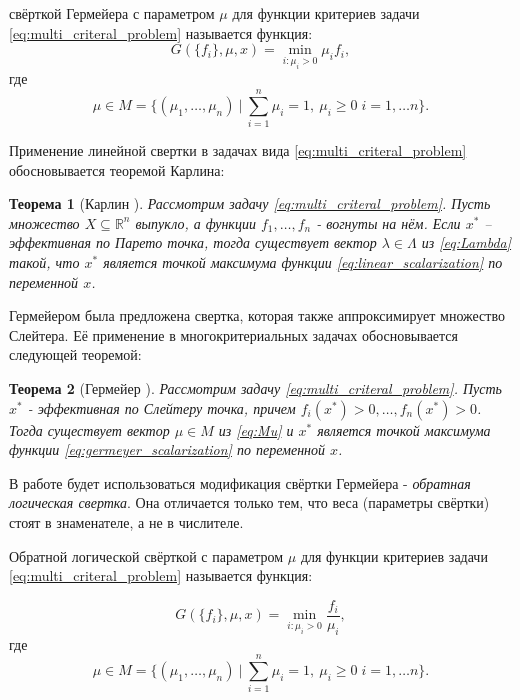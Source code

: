 \begin{Def}
	свёрткой Гермейера с параметром $\mu$ для 
	функции критериев задачи \eqref{eq:multi_criteral_problem}
	называется функция:
	\begin{equation}
		G(\{f_i\}, \mu, x)=
		\min \limits_{i: \mu_i > 0} \mu_i f_i,
		\label{eq:germeyer_scalarization}	
	\end{equation}
	где 
	\begin{equation}
		\mu \in 
		M = \{
			(\mu_1, \ldots, \mu_n) \:
			| \: \sum_{i=1}^n \mu_i = 1, \: 
			  \mu_i \geq 0 \; i = 1, \ldots n 
		\}.
		\label{eq:Mu}	
	\end{equation}
\end{Def}

Применение линейной свертки в задачах вида
\eqref{eq:multi_criteral_problem} обосновывается теоремой Карлина:

\newtheorem{Th}{Теорема}
\begin{Th}[Карлин \cite{carlin}]
	Рассмотрим задачу \eqref{eq:multi_criteral_problem}. 
	Пусть множество $X \subseteq \mathbb{R}^n$ выпукло,
	а функции $f_1, \ldots, f_n$ - вогнуты на нём.
	Если $x^*$ – эффективная по Парето точка,
    тогда существует вектор $\lambda \in \Lambda$ из 
    \eqref{eq:Lambda} такой, что $x^*$ является точкой 
    максимума функции \eqref{eq:linear_scalarization} по переменной
    $x$.   
\end{Th}

Гермейером была предложена свертка, которая также аппроксимирует 
множество Слейтера. Её применение в многокритериальных 
задачах обосновывается следующей теоремой:

\begin{Th}[Гермейер \cite{germeyer}]
	Рассмотрим задачу \eqref{eq:multi_criteral_problem}.     
    Пусть $x^*$ - эффективная по Слейтеру точка, 
    причем $f_i(x^*)>0, \ldots, f_n(x^*)>0$.
    Тогда существует вектор $\mu \in M$ из \eqref{eq:Mu} 
    и $x^*$ является точкой максимума функции 
    \eqref{eq:germeyer_scalarization} по переменной $x$. 
\end{Th}

В работе будет использоваться модификация свёртки Гермейера -
\textit{обратная логическая свертка}. Она отличается
только тем, что веса (параметры свёртки) стоят в знаменателе, 
а не в числителе.

\begin{Def}
	Обратной логической свёрткой с параметром $\mu$ для 
	функции критериев задачи \eqref{eq:multi_criteral_problem}
	называется функция:
	
	\begin{equation}
		G(\{f_i\}, \mu, x)=
		\min \limits_{i: \mu_i > 0} \frac{f_i}{\mu_i},
		\label{eq:RL_scalarization}	
	\end{equation}
	где
	\begin{equation}
		\mu \in 
		M = \{
			(\mu_1, \ldots, \mu_n) \:
			| \: \sum_{i=1}^n \mu_i = 1, \: 
			  \mu_i \geq 0 \; i = 1, \ldots n 
		\}.
		\label{eq:Mu}	
	\end{equation}
\end{Def}

